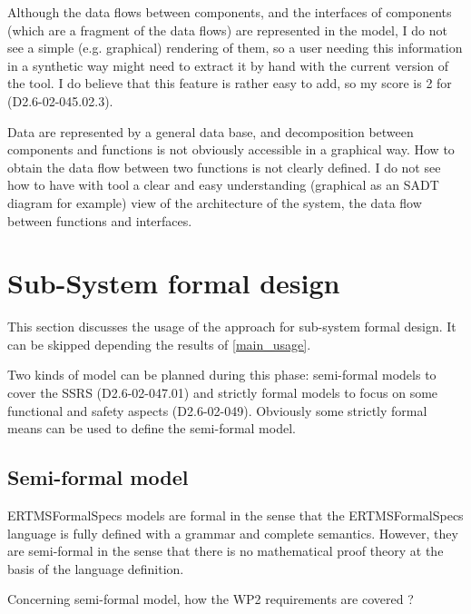 \begin{assessor1}
Although the data flows between components, and the interfaces of components (which are a fragment of the data flows) are represented in the model, I do not see a simple (e.g. graphical) rendering of them, so a user needing this information in a synthetic way might need to extract it by hand with the current version of the tool. I do believe that this feature is rather easy to add, so my score is 2 for (D2.6-02-045.02.3). 
\end{assessor1}


\begin{assessor2}
Data are represented by a general data base, and decomposition between components and functions is not obviously  accessible in a graphical way. How to obtain the data flow between two  functions is not clearly defined.
I do not see how to have with tool a clear and easy understanding (graphical as an SADT diagram for example) view of the architecture of the system, the data flow between functions and interfaces.
\end{assessor2}

\section{Sub-System formal design}
This section discusses the usage of the approach for sub-system formal design.
It can be skipped depending the results of \ref{main_usage}.

Two kinds of model can be planned during this phase: semi-formal models to  cover the SSRS (D2.6-02-047.01) and strictly formal  models to  focus on some functional and safety aspects (D2.6-02-049). Obviously some strictly  formal means can be used to define the semi-formal  model.

\subsection{Semi-formal model}

\begin{author_comment}
ERTMSFormalSpecs models are formal in the sense that the ERTMSFormalSpecs language is fully defined with a grammar and complete semantics. However, they are semi-formal in the sense that there is no mathematical proof theory at the basis of the language definition.  
\end{author_comment}

Concerning semi-formal model, how the WP2 requirements are covered ?

